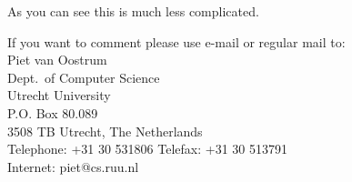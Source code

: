 \documentclass{article}
\begin{document}
As you can see this is much less complicated.

If you want to comment please use e-mail or regular mail to:\\
Piet van Oostrum\\
Dept.\ of Computer Science\\
Utrecht University\\
P.O. Box 80.089\\
3508 TB Utrecht, The Netherlands\\
Telephone: +31 30 531806 Telefax: +31 30 513791\\
Internet: piet@cs.ruu.nl 

\printindex
\end{document}
